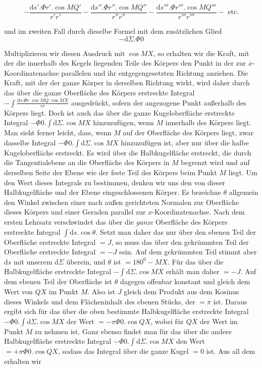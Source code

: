 \[
-\frac{\mathrm{d}s'.\Phi r'.\cos MQ'}{r'r'}-\frac{\mathrm{d}s''.\Phi r''.\cos MQ''}{r''r''}-\frac{\mathrm{d}s'''.\Phi r'''.\cos MQ'''}{r'''r'''}-\text{ etc.}
\]
\par
und im zweiten Fall durch dieselbe Formel mit dem zusätzlichen Glied
\[
-\mathrm{d}\Sigma.\Phi0
\]
\par
Multiplizieren wir diesen Ausdruck mit $\cos MX$, so erhalten wir die Kraft, mit der die innerhalb des Kegels liegenden Teile des Körpers den Punkt in der zur $x$-Koordinatenachse parallelen und ihr entgegengesetzten Richtung anziehen. Die Kraft, mit der der ganze Körper in derselben Richtung wirkt, wird daher durch das über die ganze Oberfläche des Körpers erstreckte Integral $-\int\frac{\mathrm{d}s.\Phi r.\cos MQ.\cos MX}{rr}$ ausgedrückt, sofern der angezogene Punkt außerhalb des Körpers liegt. Doch ist auch das über die ganze Kugeloberfläche erstreckte Integral $-\Phi0.\int\mathrm{d}\Sigma.\cos MX$ hinzuzufügen, wenn $M$ innerhalb des Körpers liegt. Man sieht ferner leicht, dass, wenn $M$ auf der Oberfläche des Körpers liegt, zwar dasselbe Integral $-\Phi0.\int\mathrm{d}\Sigma.\cos MX$ hinzuzufügen ist, aber nur über die halbe Kugeloberfläche erstreckt. Es wird über die Halbkugelfläche erstreckt, die durch die Tangentialebene an die Oberfläche des Körpers in $M$ begrenzt wird und auf derselben Seite der Ebene wie der feste Teil des Körpers beim Punkt $M$ liegt. Um den Wert dieses Integrals zu bestimmen, denken wir uns den von dieser Halbkugelfläche und der Ebene eingeschlossenen Körper. Es bezeichne $\theta$ allgemein den Winkel zwischen einer nach außen gerichteten Normalen zur Oberfläche dieses Körpers und einer Geraden parallel zur $x$-Koordinatenachse. Nach dem ersten Lehrsatz verschwindet das über die \textit{ganze} Oberfläche des Körpers erstreckte Integral $\int\mathrm{d}s.\cos\theta$. Setzt man daher das nur über den ebenen Teil der Oberfläche erstreckte Integral $=J$, so muss das über den gekrümmten Teil der Oberfläche erstreckte Integral $=-J$ sein. Auf dem gekrümmten Teil stimmt aber $\mathrm{d}s$ mit unserem $\mathrm{d}\Sigma$ überein, und $\theta$ ist $=180^0-MX$. Für das über die Halbkugelfläche erstreckte Integral $-\int\mathrm{d}\Sigma.\cos MX$ erhält man daher $=-J$. Auf dem ebenen Teil der Oberfläche ist $\theta$ dagegen offenbar konstant und gleich dem Wert von $QX$ im Punkt $M$. Also ist $J$ gleich dem Produkt aus dem Kosinus dieses Winkels und dem Flächeninhalt des ebenen Stücks, der $=\pi$ ist. Daraus ergibt sich für das über die oben bestimmte Halbkugelfläche erstreckte Integral $-\Phi0.\int\mathrm{d}\Sigma.\cos MX$ der Wert $=-\pi\Phi0.\cos QX$, wobei für $QX$ der Wert im Punkt $M$ zu nehmen ist. Ganz ebenso findet man für das über die andere Halbkugelfläche erstreckte Integral $-\Phi0.\int\mathrm{d}\Sigma.\cos MX$ den Wert $=+\pi\Phi0.\cos QX$, sodass das Integral über die ganze Kugel $=0$ ist. Aus all dem erhalten wir
